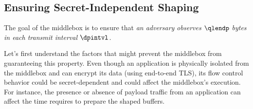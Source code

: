 %

\subsection{Ensuring Secret-Independent Shaping}
\label{subsec:impl-shaping-security}
The goal of the middlebox is to ensure that {\em an adversary observes
$\qlendp$ bytes in each transmit interval $\dpintvl$.}

Let's first understand the factors that might prevent the middlebox from
guaranteeing this property.
Even though an application is physically isolated from the middlebox and can
encrypt its data (\eg using end-to-end TLS), its flow control behavior could be
secret-dependent and could affect the middlebox's execution.
For instance, the presence or absence of payload traffic from an application
can affect the time {\dshaper} requires to prepare the shaped buffers.

